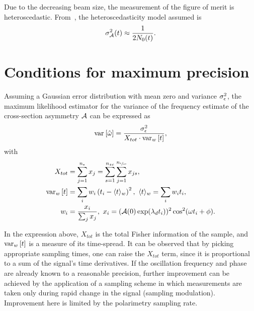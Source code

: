 \documentclass[a4paper]{jacow}
\newcommand{\meas}{\epsilon}
\newcommand{\dt}{\Delta t}
\newcommand{\Nmnd}{{n_{\sfrac{\meas}{zc}}}}
\newcommand{\Nnd}{{n_{zc}}}
\newcommand{\Nm}{{n_{\meas}}}
\newcommand{\lamd}{\lambda_d}
\begin{document}
Due to the decreasing beam size, the measurement of the figure of merit is heteroscedastic. From~\cite[p.~18]{Eversmann}, the heteroscedasticity model assumed is
\begin{equation}\label{eq:AsymHtsk}
	\SD{\Asym}^2(t) \approx \frac{1}{2N_0(t)}.
\end{equation}

\section{Conditions for maximum precision}
\DeclareDocumentCommand{\stat}{s}{\IfBooleanTF{#1}{X_{tot}}{\frac{\SD{\meas}^2}{\SE{\hat\omega}^2\cdot \var[w]{t}}}}
\newcommand{\dtnd}{\dt_{zc}}
\newcommand{\SNR}{\text{SNR}}
\newcommand{\deq}{\overset{\triangle}{=}}

Assuming a Gaussian error distribution with mean zero and variance $\SD{\meas}^2$, the maximum likelihood estimator for the variance of the frequency estimate of the cross-section asymmetry $\mathcal{A}$ can be expressed as
\[\var{\hat\omega} = \frac{\SD{\meas}^2}{X_{tot}\cdot \var[w]{t}}, \]
with
\begin{align*}
X_{tot} &= \sum_{j=1}^{\Nm} x_j = \sum_{s=1}^{\Nnd}\sum_{j=1}^{\Nmnd} x_{js}, \\
\var[w]{t} &= \sum_i w_i \bkt{t_i - \avg{t}[w]}^2,~ \avg{t}[w] = \sum_i w_i t_i, \\
w_i &= \frac{x_i}{\sum_j x_j},~ x_i = (\Asym(0)\exp(\lamd t_i))^2\cos^2(\omega t_i + \phi). %
\end{align*}

In the expression above, $X_{tot}$ is the total Fisher information of the sample, and $\var[w]{t}$ is a measure of its time-spread. It can be observed that by picking appropriate sampling times, one can raise the $X_{tot}$ term, since it is proportional to a sum of the signal's time derivatives. If the oscillation frequency and phase are already known to a reasonable precision, further improvement can be achieved by the application of a sampling scheme in which measurements are taken only during rapid change in the signal (sampling modulation). Improvement here is limited by the polarimetry sampling rate.
\end{document}

